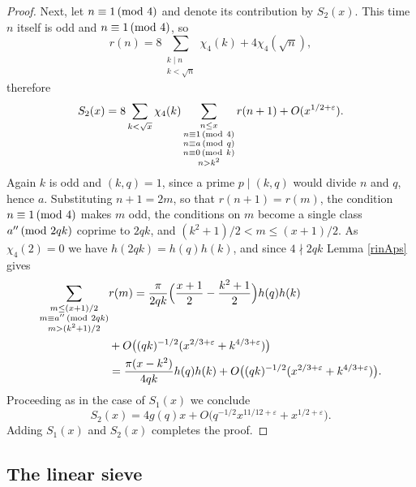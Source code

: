 \documentclass[12pt]{amsart}
\theoremstyle{remark}
\renewcommand{\pmod}[1]{\mkern3mu(\mathrm{mod}\ #1)}
\begin{document}
\begin{proof}
    Next, let $n \equiv 1 \pmod 4$ and denote its contribution by $S_2(x)$. This
    time $n$ itself is odd and $n \equiv 1 \pmod 4$, so
    \[
        r(n) = 8\sum_{\substack{k \mid n\\ k < \sqrt{n}}}\chi_4(k) + 4\chi_4(\sqrt{n}),
    \]
    therefore
    \[
        S_2(x) = 8\sum_{k<\sqrt{x}}\chi_4(k)
        \sum_{\substack{n \le x \\ n \equiv 1 \pmod 4\\ n \equiv a \pmod q \\
            n \equiv 0 \pmod k\\ n > k^2}} r(n+1) + O(x^{1/2+\varepsilon}).
    \]
    Again $k$ is odd and $(k,q)=1$, since a prime $p \mid (k,q)$ would divide $n$
    and $q$, hence $a$. Substituting $n+1 = 2m$, so that $r(n+1)=r(m)$, the
    condition $n \equiv 1 \pmod 4$ makes $m$ odd, the conditions on $m$ become a
    single class $a'' \pmod{2qk}$ coprime to $2qk$, and
    $(k^2+1)/2 < m \le (x+1)/2$. As $\chi_4(2)=0$ we have $h(2qk)=h(q)h(k)$, and
    since $4 \nmid 2qk$ Lemma \ref{rinAps} gives
    \[
        \begin{split}
            \sum_{\substack{m \le (x+1)/2 \\ m \equiv a'' \pmod{2qk} \\
                m > (k^2+1)/2}}& r(m)
            = \frac{\pi}{2qk}\Bigl(\frac{x+1}{2}-\frac{k^2+1}{2}\Bigr)h(q)h(k) \\
               &+ O\bigl((qk)^{-1/2}(x^{2/3+\varepsilon}+k^{4/3+\varepsilon})\bigr)\\
            &= \frac{\pi (x-k^2)}{4qk}h(q)h(k)
               + O\bigl((qk)^{-1/2}(x^{2/3+\varepsilon}+k^{4/3+\varepsilon})\bigr).
        \end{split}
    \]
    Proceeding as in the case of $S_1(x)$ we conclude
    \[
        S_2(x) = 4g(q)x + O\bigl(q^{-1/2}x^{11/12+\varepsilon}+x^{1/2+\varepsilon}\bigr).
    \]
    Adding $S_1(x)$ and $S_2(x)$ completes the proof.
\end{proof}



\subsection{The linear sieve} \label{linear-sieve-section}
\end{document}

